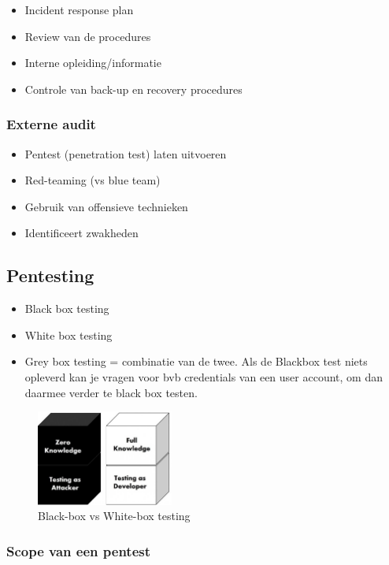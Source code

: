 \documentclass{article}
\begin{document}
\begin{itemize}
    \item Incident response plan
    \item Review van de procedures
    \item Interne opleiding/informatie
    \item Controle van back-up en recovery procedures
\end{itemize}

\subsubsection{Externe audit}

\begin{itemize}
    \item Pentest (penetration test) laten uitvoeren
    \item Red-teaming (vs blue team)
    \item Gebruik van offensieve technieken
    \item Identificeert zwakheden
\end{itemize}


\subsection{Pentesting}

\begin{itemize}
    \item Black box testing 
    \item White box testing
    \item Grey box testing = combinatie van de twee. Als de Blackbox test niets opleverd kan je vragen voor bvb credentials van een user account, om dan daarmee verder te black box testen.
\end{itemize}

\begin{figure}[H]
    \centering
    \includegraphics[width=0.4\textwidth]{pentesting.jpg}
    \caption{Black-box vs White-box testing}
\end{figure}

\subsubsection{Scope van een pentest}
\end{document}
